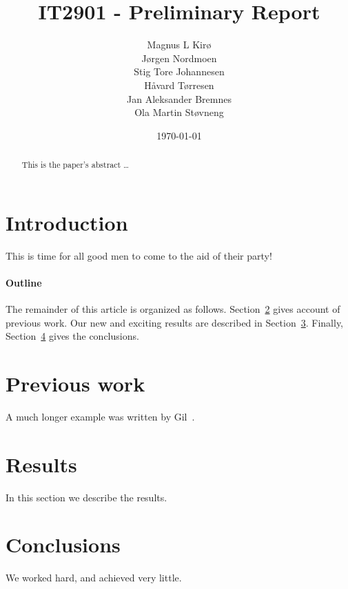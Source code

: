 \documentclass[12pt]{article}
\title{IT2901 - Preliminary Report}
\author{
        Magnus L Kirø \\
        Jørgen Nordmoen \\
        Stig Tore Johannesen \\
        Håvard Tørresen \\
        Jan Aleksander Bremnes \\
        Ola Martin Støvneng 
}
\date{\today}
\begin{document}
\maketitle
\titlepage
{}

\begin{abstract}
This is the paper's abstract \ldots
\end{abstract}

\section{Introduction}
This is time for all good men to come to the aid of their party!

\paragraph{Outline}
The remainder of this article is organized as follows.
Section~\ref{previous work} gives account of previous work.
Our new and exciting results are described in Section~\ref{results}.
Finally, Section~\ref{conclusions} gives the conclusions.

\section{Previous work}\label{previous work}
A much longer \LaTeXe{} example was written by Gil~\cite{Gil:02}.

\section{Results}\label{results}
In this section we describe the results.

\section{Conclusions}\label{conclusions}
We worked hard, and achieved very little.



\end{document}
